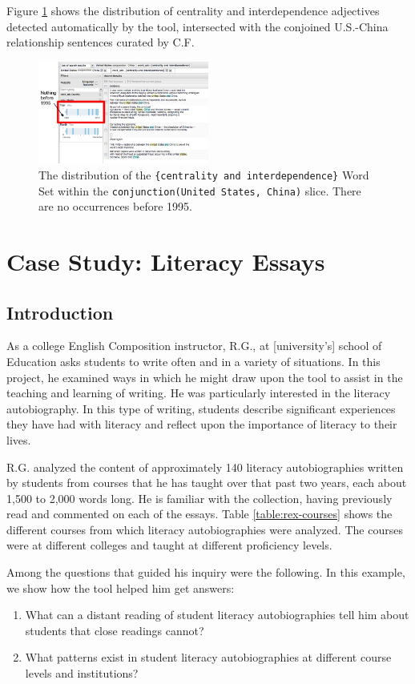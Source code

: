 \documentclass{sig-alternate}
\newcommand{\code}[1] {\texttt{#1}}
\begin{document}
\begin{enumerate}
Figure \ref{fig:chris07} shows the distribution of centrality and interdependence adjectives detected automatically by the tool, intersected with the conjoined U.S.-China relationship sentences curated by C.F.
\begin{figure}[h!]
\includegraphics[width=0.5\textwidth]{fig/chris/07.png}
\caption{ The distribution of the \code{\{centrality and interdependence\}} Word Set within the \code{conjunction(United States, China)} slice. There are no occurrences before 1995. \label{fig:chris07}}
\end{figure}




\section{Case Study: Literacy Essays}

\subsection{Introduction}
As a college English Composition instructor,  R.G., at  [university's] school of Education asks students to write often and in a variety of situations. In this project, he examined ways in which he might draw upon the tool to assist in the teaching and learning of writing. He was particularly interested in the literacy autobiography. In this type of writing, students describe significant experiences they have had with literacy and reflect upon the importance of literacy to their lives.  

R.G. analyzed the content of approximately 140 literacy autobiographies written by students from courses that he has taught over that past two years, each about 1,500 to 2,000 words long. He is familiar with the collection, having previously read and commented on each of the essays.  Table \ref{table:rex-courses} shows the different courses from which literacy autobiographies were analyzed. The courses were at different colleges and taught at different proficiency levels.

Among the questions that guided his inquiry were the following. In this example, we show how the tool helped him get answers:
\begin{enumerate}
\item What can a distant reading of student literacy autobiographies tell him about students that close readings cannot?
\item What patterns exist in student literacy autobiographies at different course levels and institutions?
\end{enumerate}


\end{enumerate}
\end{document}
